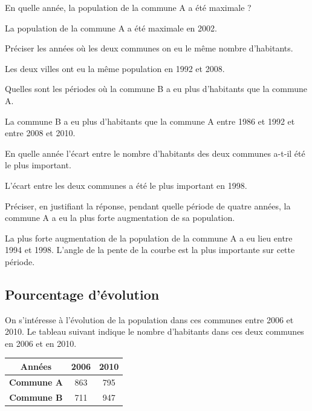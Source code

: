 \begin{questions}
	\question En quelle année, la population de la commune A a été maximale ?
	\begin{solution}
		La population de la commune A a été maximale en 2002.
	\end{solution}
	
	\question Préciser les années où les deux communes on eu le même nombre d'habitants.
	\begin{solution}
		Les deux villes ont eu la même population en 1992 et 2008.
	\end{solution}
	
	\question Quelles sont les périodes où la commune B a eu plus d'habitants que la commune A.
	\begin{solution}
		La commune B a eu plus d'habitants que la commune A entre 1986 et 1992 et entre 2008 et 2010.
	\end{solution}
	
	\question En quelle année l'écart entre le nombre d'habitants des deux communes a-t-il été le plus important.
	\begin{solution}
		L'écart entre les deux communes a été le plus important en 1998.
	\end{solution}
	
	\question Préciser, en justifiant la réponse, pendant quelle période de quatre années, la commune A a eu la plus forte augmentation de sa population.
	\begin{solution}
		La plus forte augmentation de la population de la commune A a eu lieu entre 1994 et 1998. L'angle de la pente de la courbe est la plus importante sur cette période.
	\end{solution}
\end{questions}

\subsection{Pourcentage d'évolution}

\begin{multicols}{2}

\vspace*{0.1cm}	
On s'intéresse à l'évolution de la population dans ces communes entre 2006 et 2010. Le tableau suivant indique le nombre d'habitants dans ces deux communes en 2006 et en 2010. 



	\begin{tabular}{|@{\ }c@{\ }|@{\ }c@{\ }|@{\ }c@{\ }|}
		\hline
		\textbf{Années} & \textbf{2006} & \textbf{2010}\\
		\hline
		\textbf{Commune A} & \num{863} & \num{795}  \\
		\hline 
		\textbf{Commune B} & \num{711} & \num{947}  \\
		\hline
	\end{tabular}

\end{multicols}	

